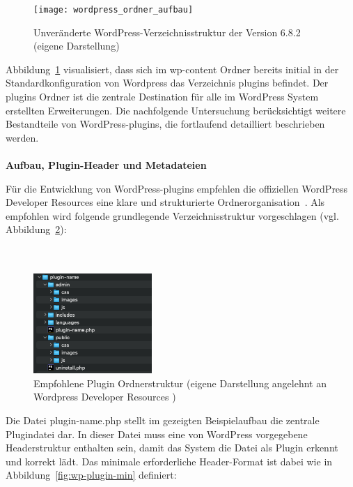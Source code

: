 \begin{figure}[tbh]
 \centering
 \texttt{[image: wordpress\_ordner\_aufbau]}
 \caption{Unveränderte WordPress-Verzeichnisstruktur der Version 6.8.2 (eigene Darstellung)}
 \label{fig:wordpress-verzeichnis}
\end{figure}
\newpage
Abbildung~\ref{fig:wordpress-verzeichnis} visualisiert, dass sich im wp-content Ordner bereits initial in der Standardkonfiguration von Wordpress das Verzeichnis plugins befindet.
Der plugins Ordner ist die zentrale Destination für alle im WordPress System erstellten Erweiterungen.
Die nachfolgende Untersuchung berücksichtigt weitere Bestandteile von WordPress-\gls{plugin}s, die fortlaufend detailliert beschrieben werden.
\\\\
\textbf{Aufbau, Plugin-Header und Metadateien}

Für die Entwicklung von WordPress-\gls{plugin}s empfehlen die offiziellen WordPress Developer Resources eine klare und strukturierte Ordnerorganisation~\cite{wordpress2024BestPractices}.
Als empfohlen wird folgende grundlegende Verzeichnisstruktur vorgeschlagen (vgl. Abbildung~\ref{fig:wp-plugin-structure}):
\\\\\\
\begin{figure}[H]
    \centering
    \includegraphics[width=0.4\textwidth]{images/wp_plugin_structure}
    \caption{Empfohlene Plugin Ordnerstruktur (eigene Darstellung angelehnt an Wordpress Developer Resources \cite{wordpress2024FolderStructure})}
    \label{fig:wp-plugin-structure}
\end{figure}

Die Datei plugin-name.php stellt im gezeigten Beispielaufbau die zentrale Plugindatei dar.
In dieser Datei muss eine von WordPress vorgegebene Headerstruktur enthalten sein, damit das System die Datei als Plugin erkennt und korrekt lädt.
Das minimale erforderliche Header-Format ist dabei wie in Abbildung~\ref{fig:wp-plugin-min} definiert:

